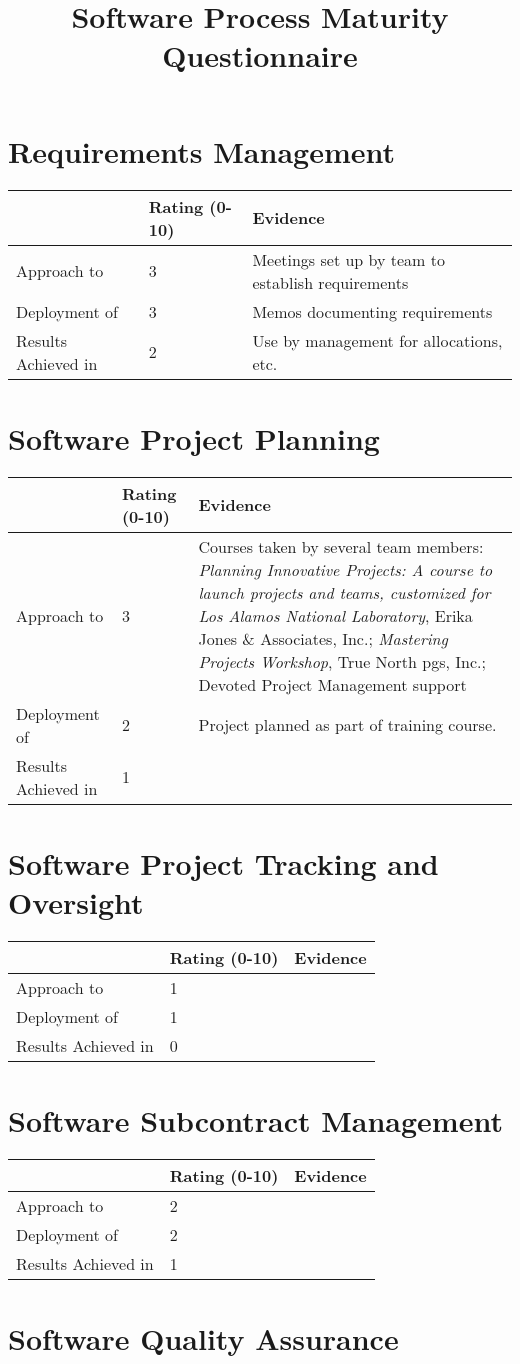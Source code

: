 \documentclass{article}
\title{Software Process Maturity Questionnaire}
\newcommand{\KPAname}{}
\newenvironment{KPABOX}[1]
	{\renewcommand{\KPAname}{#1}
	\begin{tabular}{|p{1.0in}|p{0.5in}|p{5.0in}|} \hline
	 & Rating (0-10) & Evidence \\ \hline}
	{\end{tabular}}
\newcommand{\Approach}[2]{Approach to \KPAname & #1 & #2 \\ \hline}
\newcommand{\Deployment}[2]{Deployment of \KPAname & #1 & #2 \\ \hline}
\newcommand{\Results}[2]{Results Achieved in \KPAname & #1 & #2 \\
	\hline}
\begin{document}
\maketitle

\section{Requirements Management}
 
\begin{KPABOX}{Requirements Management}
\Approach{3}{Meetings set up by team to establish requirements}
\Deployment{3}{Memos documenting requirements}
\Results{2}{Use by management for allocations, etc.}
\end{KPABOX}

\section{Software Project Planning}

\begin{KPABOX}{Software Project Planning}
\Approach{3}{Courses taken by several team members: 
             {\em Planning Innovative Projects: A course to launch
             projects and teams, customized for Los Alamos National
             Laboratory}, Erika Jones \& Associates, Inc.; 
             {\em Mastering Projects Workshop}, True North pgs, Inc.;
             Devoted Project Management support}
\Deployment{2}{Project planned as part of training course.}
\Results{1}{}
\end{KPABOX}

\section{Software Project Tracking and Oversight}

\begin{KPABOX}{Software Project Tracking and Oversight}
\Approach{1}{}
\Deployment{1}{}
\Results{0}{}
\end{KPABOX}

\section{Software Subcontract Management}

\begin{KPABOX}{Software Subcontract Management}
\Approach{2}{}
\Deployment{2}{}
\Results{1}{}
\end{KPABOX}

\section{Software Quality Assurance}
\end{document}
